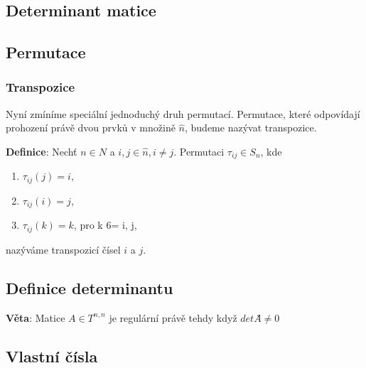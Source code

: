\documentclass[12pt, letterpaper, twoside]{article}
\begin{document}
\subsection*{Determinant matice}

\subsection{Permutace}
\subsubsection{Transpozice}

Nyní zmíníme speciální jednoduchý druh permutací.
Permutace, které odpovídají prohození právě dvou prvků v množině $\hat{n}$, budeme nazývat transpozice.

\textbf{Definice}: Nechť $n \in N$ a $i, j \in \hat{n}, i \neq j$. Permutaci $\tau_{ij} \in S_{n}$, kde

\begin{enumerate}
    \item $\tau_{ij} (j) = i$,
    \item $\tau_{ij} (i) = j$,
    \item $\tau_{ij} (k) = k$, pro k 6= i, j,
\end{enumerate}

nazýváme transpozicí čísel $i$ a $j$.

\subsection{Definice determinantu}

\textbf{Věta}: Matice $A \in T^{n,n}$ je regulární právě tehdy když $detA ̈́\neq 0$


\subsection{Vlastní čísla}
\end{document}
